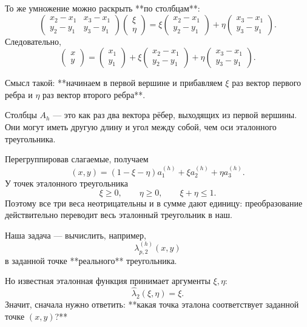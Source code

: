 \documentclass[a4paper,14pt]{extarticle}
\begin{document}
	
	То же умножение можно раскрыть **по столбцам**:
	\[
	\begin{pmatrix}
		x_2-x_1&x_3-x_1\\
		y_2-y_1&y_3-y_1
	\end{pmatrix}
	\begin{pmatrix}\xi\\\eta\end{pmatrix}
	=
	\xi\begin{pmatrix}x_2-x_1\\y_2-y_1\end{pmatrix}
	+
	\eta\begin{pmatrix}x_3-x_1\\y_3-y_1\end{pmatrix}.
	\]
	Следовательно,
	\[
	\boxed{
		\begin{pmatrix}x\\y\end{pmatrix}
		=
		\begin{pmatrix}x_1\\y_1\end{pmatrix}
		+\xi\begin{pmatrix}x_2-x_1\\y_2-y_1\end{pmatrix}
		+\eta\begin{pmatrix}x_3-x_1\\y_3-y_1\end{pmatrix}.
	}
	\]
	
	Смысл такой: **начинаем в первой вершине и прибавляем \(\xi\) раз вектор первого ребра и \(\eta\) раз вектор второго ребра**.
	
	Столбцы \(A_h\) — это как раз два вектора рёбер, выходящих из первой вершины. Они могут иметь другую длину и угол между собой, чем оси эталонного треугольника.
	
	Перегруппировав слагаемые, получаем
	\[
	(x,y)=(1-\xi-\eta)a_1^{(h)}
	+\xi a_2^{(h)}
	+\eta a_3^{(h)}.
	\]
	У точек эталонного треугольника
	\[
	\xi\ge0,\qquad \eta\ge0,\qquad \xi+\eta\le1.
	\]
	Поэтому все три веса неотрицательны и в сумме дают единицу: преобразование действительно переводит весь эталонный треугольник в наш.
	

	
	Наша задача — вычислить, например,
	\[
	\lambda_{p,2}^{(h)}(x,y)
	\]
	в заданной точке **реального** треугольника.
	
	Но известная эталонная функция принимает аргументы \(\xi,\eta\):
	\[
	\widehat\lambda_2(\xi,\eta)=\xi.
	\]
	Значит, сначала нужно ответить: **какая точка эталона соответствует заданной точке \((x,y)\)?**
	
\end{document}
